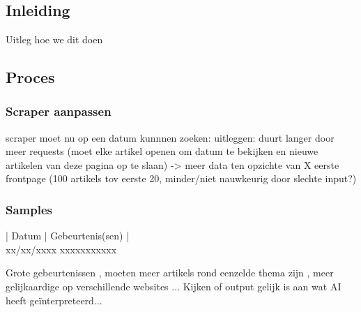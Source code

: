 \chapter{}%
\label{ch:evaluatieproces}
\section{Inleiding}
Uitleg hoe we dit doen
\section{Proces}
\subsection{Scraper aanpassen}
scraper moet nu op een datum kunnnen zoeken: uitleggen: duurt langer door meer requests (moet elke artikel openen om datum te bekijken en nieuwe artikelen van deze pagina op te slaan) -> meer data ten opzichte van X eerste frontpage (100 artikels tov eerste 20, minder/niet nauwkeurig door slechte input?)
\subsection{Samples}
 | Datum | Gebeurtenis(sen) |  \\
  xx/xx/xxxx xxxxxxxxxxx
    
     Grote gebeurtenissen , moeten meer artikels rond eenzelde thema zijn , meer gelijkaardige op verschillende websites ...
    Kijken of output gelijk is aan wat AI heeft geïnterpreteerd...
    
    
